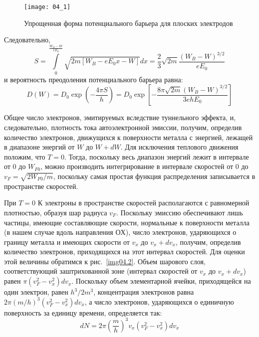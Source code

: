 \begin{figure}[h]
    \center
    \texttt{[image: 04\_1]}
    \caption{Упрощенная форма потенциального барьера для плоских электродов}
    \label{img04.1}
\end{figure}
 
Следовательно,
\[
	S = \int\limits_{0}^{\frac{W_B - W}{eE_0}} \sqrt{2m[W_B-eE_0 x - W]}dx = 
		\frac{2}{3}\sqrt{2m}\frac{(W_B-W)^{3/2}}{eE_0}
\]
и вероятность преодоления потенциального барьера равна:
\begin{equation}
	D(W) = D_0 \exp\left( -\frac{4\pi S}{h} \right) = 
		D_0 \exp\left[ -\frac{8\pi\sqrt{2m}(W_B-W)^{3/2}}{3ehE_0} \right]
	\label{eq04.1.13}
\end{equation}

Общее число электронов, эмитируемых вследствие туннельного эффекта, и, 
следовательно, плотность тока автоэлектронной эмиссии, получим, определив 
количество электронов, движущихся к поверхности металла с энергией, лежащей в 
диапазоне энергий от \( W \) до \( W + dW \). Для исключения теплового 
движения положим, что \( T = 0 \). Тогда, поскольку весь диапазон энергий 
лежит в интервале от \( 0 \) до \( W_{F0} \), можно производить интегрирование 
в интервале скоростей от \( 0 \) до \( v_F = \sqrt{2W_{F0}/m} \), поскольку 
самая простая функция распределения записывается в пространстве скоростей.

При \( T = 0 \) К электроны в пространстве скоростей располагаются с 
равномерной плотностью, образуя шар радиуса \( v_F \). Поскольку эмиссию 
обеспечивают лишь частицы, имеющие составляющие скорости, нормальные к 
поверхности металла (в нашем случае вдоль направления \(ОХ\)), число 
электронов, ударяющихся о границу металла и имеющих скорости от \( v_x \) до 
\( v_x + dv_x \), получим, определив количество электронов, приходящихся на 
этот интервал скоростей. Для оценки этой величины обратимся к 
рис.~\ref{img04.2}. Объем шарового слоя, соответствующий заштрихованной зоне 
(интервал скоростей от \( v_x \) до \( v_x + dv_x\)) равен 
\( \pi(v^2_F - v^2_x)dv_x \). Поскольку объем элементарной ячейки, 
приходящейся на один электрон, равен \( h^3 / 2m^3 \), концентрация электронов 
равна \( 2\pi(m/h)^3 (v^2_F - v^2_x)dv_x \), а число электронов, ударяющихся о 
единичную поверхность за единицу времени, определяется так:
\begin{equation}
	dN = 2\pi\left( \frac{m}{h} \right)^3 v_x \left( v^2_F - v^2_x \right)dv_x
	\label{eq04.1.14}
\end{equation}

